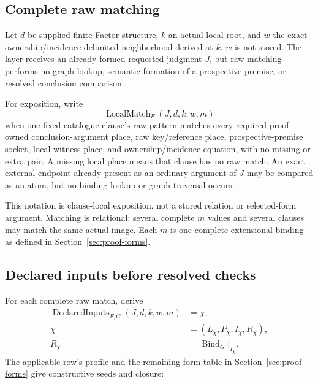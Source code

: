 \documentclass[11pt,twoside]{article}
\begin{document}
\subsection{Complete raw matching}

Let \(d\) be supplied finite Factor structure, \(k\) an actual local root, and
\(w\) the exact ownership/incidence-delimited neighborhood derived at \(k\).
\(w\) is not stored.  The layer receives an already formed requested judgment
\(J\), but raw matching performs no graph lookup, semantic formation of a
prospective premise, or resolved conclusion comparison.

For exposition, write
\[
  \operatorname{LocalMatch}_{F}(J,d,k;w,m)
\]
when one fixed catalogue clause's raw pattern matches every required
proof-owned conclusion-argument place, raw key/reference place,
prospective-premise socket, local-witness place, and ownership/incidence equation,
with no missing or extra pair.  A missing local place means that clause has no raw
match.  An exact external endpoint already present as an ordinary argument of
\(J\) may be compared as an atom, but no binding lookup or graph traversal occurs.

This notation is clause-local exposition, not a stored relation or selected-form
argument.  Matching is relational: several complete \(m\) values and several
clauses may match the same actual image.  Each \(m\) is one complete extensional
binding as defined in Section~\ref{sec:proof-forms}.

\subsection{Declared inputs before resolved checks}

For each complete raw match, derive
\[
\begin{split}
 \operatorname{DeclaredInputs}_{F,G}(J,d,k,w,m)
   &=\chi,\\
 \chi&=(L_\chi,P_\chi,I_\chi,R_\chi),\\
 R_\chi&=\operatorname{Bind}_G|_{I_\chi}.
\end{split}
\]
The applicable row's profile and the remaining-form table in
Section~\ref{sec:proof-forms} give constructive seeds and closure:
\end{document}
